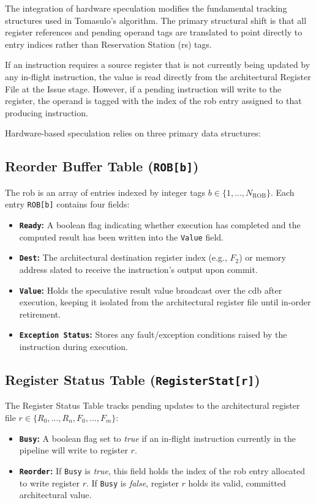 The integration of hardware speculation modifies the fundamental tracking structures used in Tomasulo's algorithm. The primary structural shift is that all register references and pending operand tags are translated to point directly to  entry indices rather than Reservation Station (\gls{rs}) tags. 

If an instruction requires a source register that is not currently being updated by any in-flight instruction, the value is read directly from the architectural Register File at the Issue stage. However, if a pending instruction will write to the register, the operand is tagged with the index of the \gls{rob} entry assigned to that producing instruction.

Hardware-based speculation relies on three primary data structures:

\subsection{Reorder Buffer Table (\texttt{ROB[b]})}
The \gls{rob} is an array of entries indexed by integer tags $b \in \{1, \dots, N_{\text{ROB}}\}$. Each entry \texttt{ROB[b]} contains four fields:
\begin{itemize}
    \item \textbf{\texttt{Ready}:} A boolean flag indicating whether execution has completed and the computed result has been written into the \texttt{Value} field.
    \item \textbf{\texttt{Dest}:} The architectural destination register index (e.g., $F_2$) or memory address slated to receive the instruction's output upon commit.
    \item \textbf{\texttt{Value}:} Holds the speculative result value broadcast over the \gls{cdb} after execution, keeping it isolated from the architectural register file until in-order retirement.
    \item \textbf{\texttt{Exception Status}:} Stores any fault/exception conditions raised by the instruction during execution.
\end{itemize}

\subsection{Register Status Table (\texttt{RegisterStat[r]})}
The Register Status Table tracks pending updates to the architectural register file $r \in \{R_0, \dots, R_n, F_0, \dots, F_m\}$:
\begin{itemize}
    \item \textbf{\texttt{Busy}:} A boolean flag set to \textit{true} if an in-flight instruction currently in the pipeline will write to register $r$.
    \item \textbf{\texttt{Reorder}:} If \texttt{Busy} is \textit{true}, this field holds the index of the \gls{rob} entry allocated to write register $r$. If \texttt{Busy} is \textit{false}, register $r$ holds its valid, committed architectural value.
\end{itemize}

